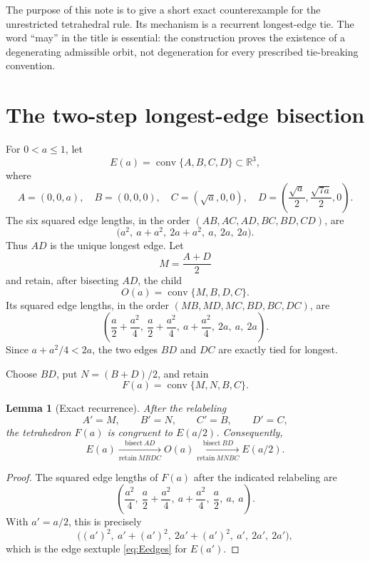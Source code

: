 \documentclass[10pt]{article}
\newtheorem{lemma}[theorem]{Lemma}
\theoremstyle{definition}
\DeclareMathOperator{\conv}{conv}
\newcommand{\R}{\mathbb{R}}
\begin{document}
The purpose of this note is to give a short exact counterexample for the unrestricted tetrahedral rule.  Its mechanism is a recurrent longest-edge tie.  The word ``may'' in the title is essential: the construction proves the existence of a degenerating admissible orbit, not degeneration for every prescribed tie-breaking convention.

\section{The two-step longest-edge bisection}

For $0<a\leq1$, let
\begin{equation}\label{eq:family}
E(a)=\conv\{A,B,C,D\}\subset\R^3,
\end{equation}
where
\begin{equation}\label{eq:vertices}
A=(0,0,a),\quad B=(0,0,0),\quad C=(\sqrt a,0,0),\quad
D=\left(\frac{\sqrt a}{2},\frac{\sqrt{7a}}2,0\right).
\end{equation}
The six squared edge lengths, in the order $(AB,AC,AD,BC,BD,CD)$, are
\begin{equation}\label{eq:Eedges}
\bigl(a^2,\ a+a^2,\ 2a+a^2,\ a,\ 2a,\ 2a\bigr).
\end{equation}
Thus $AD$ is the unique longest edge.  Let
\[
M=\frac{A+D}{2}
\]
and retain, after bisecting $AD$, the child
\[
O(a)=\conv\{M,B,D,C\}.
\]
Its squared edge lengths, in the order $(MB,MD,MC,BD,BC,DC)$, are
\begin{equation}\label{eq:Oedges}
\left(\frac a2+\frac{a^2}{4},\ \frac a2+\frac{a^2}{4},\
 a+\frac{a^2}{4},\ 2a,\ a,\ 2a\right).
\end{equation}
Since $a+a^2/4<2a$, the two edges $BD$ and $DC$ are exactly tied for longest.

Choose $BD$, put $N=(B+D)/2$, and retain
\[
F(a)=\conv\{M,N,B,C\}.
\]

\begin{lemma}[Exact recurrence]\label{lem:recurrence}
After the relabeling
\[
A'=M,\qquad B'=N,\qquad C'=B,\qquad D'=C,
\]
the tetrahedron $F(a)$ is congruent to $E(a/2)$.  Consequently,
\begin{equation}\label{eq:recurrence}
\boxed{
E(a)\xrightarrow[\mathrm{retain}\ MBDC]{\mathrm{bisect}\ AD}
O(a)\xrightarrow[\mathrm{retain}\ MNBC]{\mathrm{bisect}\ BD}
E(a/2).}
\end{equation}
\end{lemma}

\begin{proof}
The squared edge lengths of $F(a)$ after the indicated relabeling are
\[
\left(\frac{a^2}{4},\ \frac a2+\frac{a^2}{4},\ a+\frac{a^2}{4},\
\frac a2,\ a,\ a\right).
\]
With $a'=a/2$, this is precisely
\[
\bigl((a')^2,\ a'+(a')^2,\ 2a'+(a')^2,\ a',\ 2a',\ 2a'\bigr),
\]
which is the edge sextuple \eqref{eq:Eedges} for $E(a')$.
\end{proof}
\end{document}
